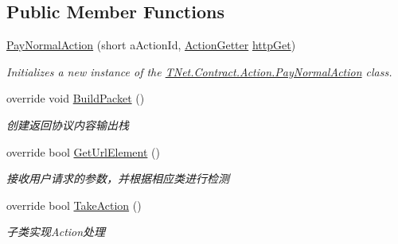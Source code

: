\subsection*{Public Member Functions}
\begin{DoxyCompactItemize}
\item 
\mbox{\hyperlink{class_t_net_1_1_contract_1_1_action_1_1_pay_normal_action_a72ff055645bb316a5d0941888c324218}{Pay\+Normal\+Action}} (short a\+Action\+Id, \mbox{\hyperlink{class_t_net_1_1_service_1_1_action_getter}{Action\+Getter}} \mbox{\hyperlink{class_t_net_1_1_service_1_1_base_struct_a04c1171f14d9ee44612f9966a8d61d30}{http\+Get}})
\begin{DoxyCompactList}\small\item\em Initializes a new instance of the \mbox{\hyperlink{class_t_net_1_1_contract_1_1_action_1_1_pay_normal_action}{T\+Net.\+Contract.\+Action.\+Pay\+Normal\+Action}} class. \end{DoxyCompactList}\item 
override void \mbox{\hyperlink{class_t_net_1_1_contract_1_1_action_1_1_pay_normal_action_ab651bf055c2afe438f69d440942226c2}{Build\+Packet}} ()
\begin{DoxyCompactList}\small\item\em 创建返回协议内容输出栈 \end{DoxyCompactList}\item 
override bool \mbox{\hyperlink{class_t_net_1_1_contract_1_1_action_1_1_pay_normal_action_a08e96de1d636184b07eefe68660cb0c6}{Get\+Url\+Element}} ()
\begin{DoxyCompactList}\small\item\em 接收用户请求的参数，并根据相应类进行检测 \end{DoxyCompactList}\item 
override bool \mbox{\hyperlink{class_t_net_1_1_contract_1_1_action_1_1_pay_normal_action_aa8648c2a4c6bef0a27d694dcd953e516}{Take\+Action}} ()
\begin{DoxyCompactList}\small\item\em 子类实现\+Action处理 \end{DoxyCompactList}\end{DoxyCompactItemize}
